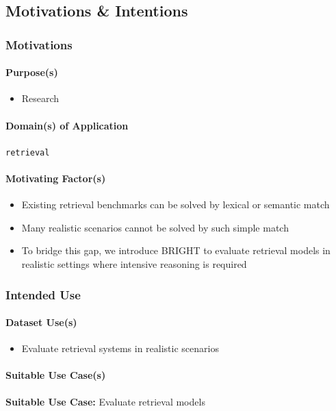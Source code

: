 \subsection{Motivations \& Intentions}

\subsubsection{Motivations}

\paragraph{Purpose(s)}
\begin{itemize}
    \item Research
\end{itemize}

\paragraph{Domain(s) of Application}
\texttt{retrieval}

\paragraph{Motivating Factor(s)}
\begin{itemize}
    \item Existing retrieval benchmarks can be solved by lexical or semantic match
    \item Many realistic scenarios cannot be solved by such simple match
    \item To bridge this gap, we introduce BRIGHT to evaluate retrieval models in realistic settings where intensive reasoning is required
\end{itemize}

\subsubsection{Intended Use}

\paragraph{Dataset Use(s)}
\begin{itemize}
    \item Evaluate retrieval systems in realistic scenarios
\end{itemize}

\paragraph{Suitable Use Case(s)}
\textbf{Suitable Use Case:} Evaluate retrieval models

